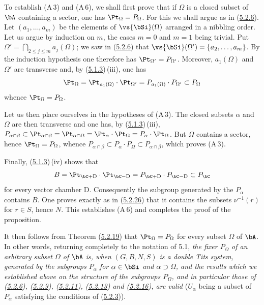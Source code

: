 \documentclass[12pt,a4paper,oneside,english]{smfart}
\makeatletter
\newcommand{\btanchor}[1]{\leavevmode\Hy@raisedlink{\hypertarget{bt:#1}{}}}
\newcommand{\btref}[1]{\hyperlink{bt:#1}{#1}}
\theoremstyle{definition}
\theoremstyle{bt}
\makeatother
\begin{document}
To establish (A\,3) and (A\,6), we shall first prove that if $\Omega$ is a
closed subset of $\bA$ containing a sector, one has $\Pt_{\Omega}=P_{\Omega}$.
For this we shall argue as in (\btref{5.2.6}). Let $(a_{1},\dots,a_{m})$ be the elements
of $\vs{\bSi}(\Omega)$ arranged in a nibbling order. Let us argue by induction
on $m$, the cases $m=0$ and $m=1$ being trivial. Put
$\Omega'=\bigcap_{2\leqslant j\leqslant m}a_{j}(\Omega)$; we saw in (\btref{5.2.6}) that
$\vs{\bSi}(\Omega')=\{a_{2},\dots,a_{m}\}$. By the induction hypothesis one
therefore has $\Pt_{\Omega'}=P_{\Omega'}$. Moreover, $a_{1}(\Omega)$ and
$\Omega'$ are transverse and, by (\btref{5.1.3})\,(iii), one has
\[
\Pt_{\Omega}=\Pt_{a_{1}(\Omega)}\cdot\Pt_{\Omega'}
=P_{a_{1}(\Omega)}\cdot P_{\Omega'}\subset P_{\Omega}
\]
whence $\Pt_{\Omega}=P_{\Omega}$.

Let us then place ourselves in the hypotheses of (A\,3). The closed subsets
$\alpha$ and $\Omega$ are then transverse and one has, by (\btref{5.1.3})\,(iii),
$P_{\alpha\cap\beta}\subset\Pt_{\alpha\cap\beta}=\Pt_{\alpha\cap\Omega}
=\Pt_{\alpha}\cdot\Pt_{\Omega}=P_{\alpha}\cdot\Pt_{\Omega}$. But $\Omega$
contains a sector, hence $\Pt_{\Omega}=P_{\Omega}$, whence
$P_{\alpha\cap\beta}\subset P_{\alpha}\cdot P_{\Omega}\subset P_{\alpha\cap\beta}$,
which proves (A\,3).

Finally, (\btref{5.1.3})\,(iv) shows that
\[
B=\Pt_{\bC+\mathrm{D}}\cdot\Pt_{\bC-\mathrm{D}} =P_{\bC+\mathrm{D}}\cdot P_{\bC-\mathrm{D}}\subset P_{\bC}
\]
for every vector chamber $\mathrm{D}$. Consequently the subgroup generated by
the $P_{\alpha}$ contains $B$. One proves exactly as in (\btref{5.2.26}) that it
contains the subsets $\nu^{-1}(r)$ for $r\in S$, hence $N$. This establishes
(A\,6) and completes the proof of the proposition.

\btanchor{5.2.28}
It then follows from Theorem (\btref{5.2.19}) that $\Pt_{\Omega}=P_{\Omega}$ for every
subset $\Omega$ of $\bA$. In other words, returning completely to the notation
of 5.1, \emph{the fixer $P_{\Omega}$ of an arbitrary subset $\Omega$ of $\bA$
is, when $(G,B,N,S)$ is a double Tits system, generated by the subgroups
$P_{\alpha}$ for $\alpha\in\bSi$ and $\alpha\supset\Omega$, and the results
which we established above on the structure of the subgroups $P_{\Omega}$, and
in particular those of \textup{(\btref{5.2.6})}, \textup{(\btref{5.2.9})}, \textup{(\btref{5.2.11})},
\textup{(\btref{5.2.13})} and \textup{(\btref{5.2.16})}, are valid} ($U_{\alpha}$ being a subset
of $P_{\alpha}$ satisfying the conditions of (\btref{5.2.3})).
\end{document}
